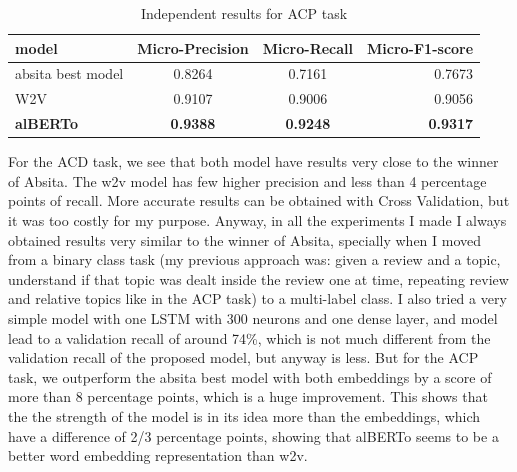 \documentclass{article}
\begin{document}
                \begin{table}[h!]
                    \begin{center}
                        \caption{Independent results for ACP task}
                        \label{tab:table4}
                        \begin{tabular}{l|c|c|r}
                            \textbf{model} & \textbf{Micro-Precision} & \textbf{Micro-Recall} & \textbf{Micro-F1-score}\\
                            \hline
                                absita best model & 0.8264 & 0.7161 & 0.7673\\
                                W2V & 0.9107 & 0.9006 & 0.9056\\
                                \textbf{alBERTo} & \textbf{0.9388} & \textbf{0.9248} & \textbf{0.9317}\\
                        \end{tabular}
                    \end{center}
                \end{table}
            For the ACD task, we see that both model have results very close to the winner of Absita.
            The w2v model has few higher precision and less than 4 percentage points of recall.
            More accurate results can be obtained with Cross Validation, but it was too costly for my purpose.
            Anyway, in all the experiments I made I always obtained results very similar to the winner of Absita, specially when I moved from a binary class task (my previous approach was: given a review and a topic, understand if that topic was dealt inside the review one at time, repeating review and relative topics like in the ACP task) to a multi-label class.
            I also tried a very simple model with one LSTM with 300 neurons and one dense layer, and model lead to a validation recall of around 74\%, which is not much different from the validation recall of the proposed model, but anyway is less.
            But for the ACP task, we outperform the absita best model with both embeddings by a score of more than 8 percentage points, which is a huge improvement.
            This shows that the the strength of the model is in its idea more than the embeddings, which have a difference of 2/3 percentage points, showing that alBERTo seems to be a better word embedding representation than w2v.
\end{document}
